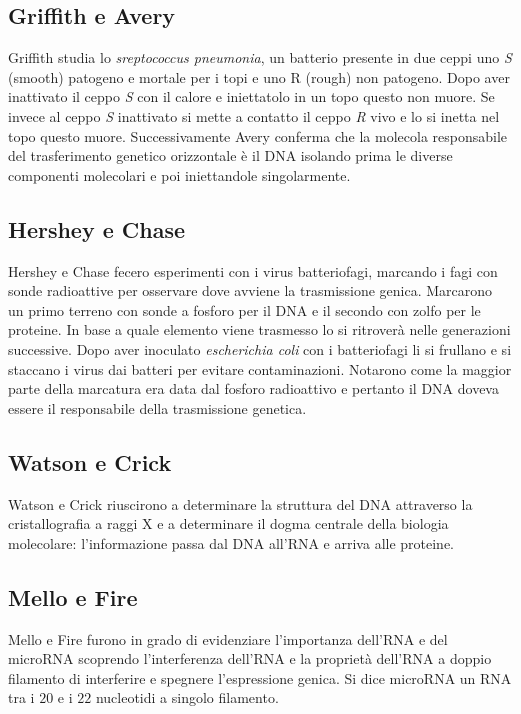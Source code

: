 \subsection{Griffith e Avery}
Griffith studia lo \emph{sreptococcus pneumonia}, un batterio presente in due ceppi uno \emph{S} (smooth) patogeno e mortale per i topi e uno R (rough) non patogeno. Dopo aver 
inattivato il ceppo \emph{S} con il calore e iniettatolo in un topo questo non muore. Se invece al ceppo \emph{S} inattivato si mette a contatto il ceppo \emph{R} vivo e lo si inetta nel 
topo questo muore. Successivamente Avery conferma che la molecola responsabile del trasferimento genetico orizzontale \`e il DNA isolando prima le diverse componenti molecolari e poi 
iniettandole singolarmente. 
\subsection{Hershey e Chase}
Hershey e Chase fecero esperimenti con i virus batteriofagi, marcando i fagi con sonde radioattive per osservare dove avviene la trasmissione genica. Marcarono un primo terreno con 
sonde a fosforo \textbf{} per il DNA e il secondo con zolfo \textbf{} per le proteine. In base a quale elemento viene trasmesso lo si ritrover\`a nelle generazioni 
successive. Dopo aver inoculato \emph{escherichia coli} con i batteriofagi li si frullano e si staccano i virus dai batteri per evitare contaminazioni. Notarono come la maggior parte 
della marcatura era data dal fosforo radioattivo e pertanto il DNA doveva essere il responsabile della trasmissione genetica. 
\subsection{Watson e Crick}
Watson e Crick riuscirono a determinare la struttura del DNA attraverso la cristallografia a raggi X e a determinare il dogma centrale della biologia molecolare: l'informazione passa 
dal DNA all'RNA e arriva alle proteine. 
\subsection{Mello e Fire}
Mello e Fire furono in grado di evidenziare l'importanza dell'RNA e del microRNA scoprendo l'interferenza dell'RNA e la propriet\`a dell'RNA a doppio filamento di interferire e spegnere
l'espressione genica. Si dice microRNA un RNA tra i $20$ e i $22$ nucleotidi a singolo filamento. 
